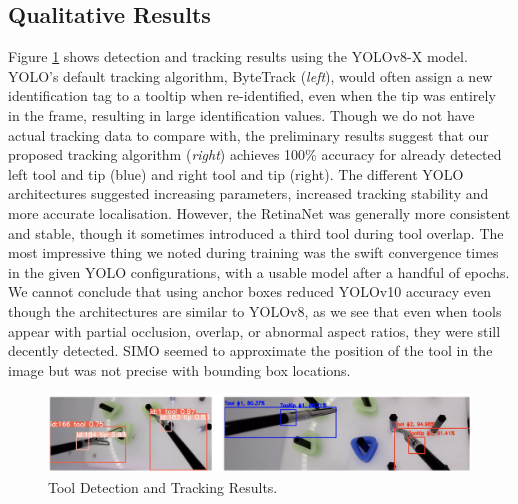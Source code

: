 \normalsize

\subsection{Qualitative Results}

Figure \ref{fig:test5_results} shows detection and tracking results using the YOLOv8-X model. YOLO's default tracking algorithm, ByteTrack (\textit{left}), would often assign a new identification tag to a tooltip when re-identified, even when the tip was entirely in the frame, resulting in large identification values. Though we do not have actual tracking data to compare with, the preliminary results suggest that our proposed tracking algorithm (\textit{right}) achieves 100\% accuracy for already detected left tool and tip (blue) and right tool and tip (right). The different YOLO architectures suggested increasing parameters, increased tracking stability and more accurate localisation. However, the RetinaNet was generally more consistent and stable, though it sometimes introduced a third tool during tool overlap. The most impressive thing we noted during training was the swift convergence times in the given YOLO configurations, with a usable model after a handful of epochs. We cannot conclude that using anchor boxes reduced YOLOv10 accuracy even though the architectures are similar to YOLOv8, as we see that even when tools appear with partial occlusion, overlap, or abnormal aspect ratios, they were still decently detected. SIMO seemed to approximate the position of the tool in the image but was not precise with bounding box locations.

\begin{figure}[htbp]
    \centering
    \vspace*{-3mm}
    \includegraphics[width=1\linewidth]{test5_results.png}
    \vspace*{-7.5mm}
    \caption{Tool Detection and Tracking Results.}
    \vspace*{-6mm}
    \label{fig:test5_results}
\end{figure}

